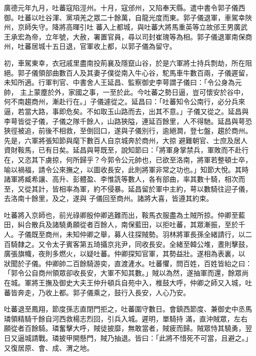 \begin{pinyinscope}
 廣德元年九月，吐蕃寇陷涇州。十月，寇邠州，又陷奉天縣。遣中書令郭子儀西御。吐蕃以吐谷渾、黨項羌之眾二十餘萬，自龍光度而東。郭子儀退軍，車駕幸陜州，京師失守。降將高暉引吐
 蕃入上都城，與吐蕃大將馬重英等立故邠王男廣武王承宏為帝，立年號，大赦，署置官員，尋以司封崔瑰等為相。郭子儀退軍南保商州，吐蕃居城十五日退，官軍收上都，以郭子儀為留守。



 初，車駕東幸，衣冠戚里盡南投荊襄及隱竄山谷，於是六軍將士持兵剽劫，所在阻絕。郭子儀領部曲數百人及其妻子僕從南入牛心谷，駝馬車牛數百兩，子儀遲留，未知所適。行軍判官、中書舍人王延昌、監察御史李萼謂子儀曰：「令公身為元帥，
 主上蒙塵於外，家國之事，一至於此。今吐蕃之勢日逼，豈可懷安於谷中，何不南趨商州，漸赴行在。」子儀遽從之。延昌曰：「吐蕃知令公南行，必分兵來逼，若當大路，事即危矣。不如取玉山路而去，出其不意。」子儀又從之。延昌與李萼皆從子儀，子儀之隊千餘人，山路狹隘，連延百餘里，人不得馳。延昌與萼恐狹徑被追，前後不相救，至倒回口，遂與子儀別行，逾絕澗，登七盤，趨於商州。先是，六軍將張知節與麾下數百人自京城奔於商州，大掠
 避難朝官、士庶及居人資財鞍馬，已有日矣。延昌與萼既至，說知節曰：「將軍身掌禁兵，軍敗而不赴行在，又恣其下虜掠，何所歸乎？今郭令公元帥也，已欲至洛南，將軍若整頓士卒，喻以禍福，請令公來撫之，以圖收長安，此則將軍非常之功也。」知節大悅。其時諸軍將臧希讓、高升、彭體盈、李惟詵等數人，各有部曲，率其數十騎，相次而至，又從其計，皆相率為軍，約不侵暴。延昌留於軍中主約，萼以數騎往迎子儀，去洛南十餘里，及之，遂與
 子儀回至商州。諸將大喜，皆遵其約束。



 吐蕃將入京師也，前光祿卿殷仲卿逃難而出，鞍馬衣服盡為土賊所掠。仲卿至藍田，糾合散兵及諸驍勇願從者百餘人，南保藍田，以拒吐蕃，其眾漸振，至於千人。子儀既至商州，未知仲卿之舉，募人往探賊勢。羽林將軍長孫全緒請行，以二百騎隸之。又令太子賓客第五琦攝京兆尹，同收長安。全緒至韓公堆，晝則擊鼓，廣張旗幟，夜則多燃火，以疑吐蕃。仲卿探知官軍，其勢益壯。遂相為表裏，以
 狀聞於子儀。仲卿帥二百餘騎游奕，直渡滻水。吐蕃懼，問百姓，百姓皆紿之曰：「郭令公自商州領眾卻收長安，大軍不知其數。」賊以為然，遂抽軍而還，餘眾尚在城。軍將王撫及御史大夫王仲升頓兵自苑中入，椎鼓大呼，仲卿之師又入城，吐蕃皆奔走，乃收上都。郭子儀乘之，鼓行入長安，人心乃安。



 吐蕃退至鳳翔，節度孫志直閉門拒之，吐蕃圍守數日。會鎮西節度、兼御史中丞馬璘領精騎千餘自河西救楊志烈回，引兵入城。遲明，單騎持
 滿，直沖賊眾，左右願從者百餘騎。璘奮擊大呼，賊徒披靡，無敢當者，賊疲而歸。賊眾恃其驍勇，翌日又逼城請戰。璘披甲開懸門，賊乃抽退。皆曰：「此將不惜死不可當，且避之。」又復居原、會、成、渭之地。




\end{pinyinscope}
